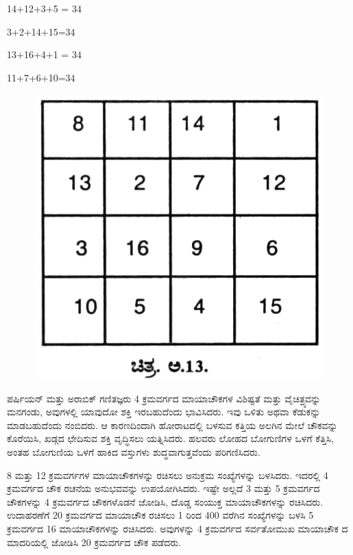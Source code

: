 14+12+3+5 = 34

3+2+14+15=34

13+16+4+1 = 34

11+7+6+10=34
\begin{figure}[H]
\includegraphics{src/figures/chap9/fig9.9.jpg}
\end{figure}

ಪರ್ಷಿಯನ್ ಮತ್ತು ಅರಾಬಿಕ್ ಗಣಿತಜ್ಞರು 4 ಕ್ರಮವರ್ಗದ ಮಾಯಾಚೌಕಗಳ ವಿಶಿಷ್ಟತೆ ಮತ್ತು ವೈಚಿತ್ರ್ಯವನ್ನು ಮನಗಂಡು, ಅವುಗಳಲ್ಲಿ ಯಾವುದೋ ಶಕ್ತಿ ಇರಬಹುದೆಂದು ಭಾವಿಸಿದರು. ಇವು ಒಳಿತು ಅಥವಾ ಕೆಡುಕನ್ನು ಮಾಡಬಹುದೆಂದು ನಂಬಿದರು. ಆ ಕಾರಣದಿಂದಾಗಿ ಹೋರಾಟದಲ್ಲಿ ಬಳಸುವ ಕತ್ತಿಯ ಅಲಗಿನ ಮೇಲೆ ಚೌಕವನ್ನು ಕೊರೆಯಿಸಿ, ಖಡ್ಗದ ಛೇದಿಸುವ ಶಕ್ತಿ ವೃದ್ಧಿಸಲು ಯತ್ನಿಸಿದರು. ಹಲವರು ಲೋಹದ ಬೋಗುಣಿಗಳ ಒಳಗೆ ಕೆತ್ತಿಸಿ, ಅಂತಹ ಬೋಗುಣಿಯ ಒಳಗೆ ಹಾಕಿದ ವಸ್ತುಗಳು ಶುದ್ಧವಾಗುತ್ತವೆಂದು ಪರಿಗಣಿಸಿದರು.

8 ಮತ್ತು 12 ಕ್ರಮವರ್ಗಗಳ ಮಾಯಾಚೌಕಗಳನ್ನು ರಚಿಸಲು ಅನುಕ್ರಮ ಸಂಖ್ಯೆಗಳನ್ನು ಬಳಸಿದರು. ಇದರಲ್ಲಿ 4 ಕ್ರಮವರ್ಗದ ಚೌಕ ರಚನೆಯ ಅನುಭವವನ್ನು ಉಪಯೋಗಿಸಿದರು. ಇಷ್ಟೇ ಅಲ್ಲದೆ 3 ಮತ್ತು 5 ಕ್ರಮವರ್ಗದ ಚೌಕಗಳನ್ನು 4 ಕ್ರಮವರ್ಗದ ಚೌಕಗಳೊಡನೆ ಜೋಡಿಸಿ, ದೊಡ್ಡ ಸಂಯುಕ್ತ ಮಾಯಾಚೌಕಗಳನ್ನು ರಚಿಸಿದರು. ಉದಾಹರಣೆಗೆ 20 ಕ್ರಮವರ್ಗದ ಮಾಯಾಚೌಕ ರಚಿಸಲು 1 ರಿಂದ 400 ವರೆಗಿನ ಸಂಖ್ಯೆಗಳನ್ನು ಬಳಸಿ 5 ಕ್ರಮವರ್ಗದ 16 ಮಾಯಾಚೌಕಗಳನ್ನು ರಚಿಸಿದರು. ಅವುಗಳನ್ನು 4 ಕ್ರಮವರ್ಗದ ಸರ್ವತೋಮುಖ ಮಾಯಾಚೌಕ ದ ಮಾದರಿಯಲ್ಲಿ ಜೋಡಿಸಿ 20 ಕ್ರಮವರ್ಗದ ಚೌಕ ಪಡೆದರು.

